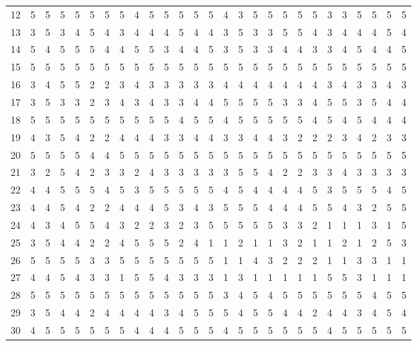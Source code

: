 \begin{table}[htbp]
{\begin{tabular}{c *{26}{c}}
12 & 5 & 5 & 5 & 5 & 5 & 5 & 5 & 4 & 5 & 5 & 5 & 5 & 5 & 4 & 3 & 5 & 5 & 5 & 5 & 5 & 3 & 3 & 5 & 5 & 5 & 5 \\
13 & 3 & 5 & 3 & 4 & 5 & 4 & 3 & 4 & 4 & 4 & 5 & 4 & 4 & 3 & 5 & 3 & 3 & 5 & 5 & 4 & 3 & 4 & 4 & 4 & 5 & 4 \\
14 & 5 & 4 & 5 & 5 & 5 & 4 & 4 & 5 & 5 & 3 & 4 & 4 & 5 & 3 & 5 & 3 & 3 & 4 & 4 & 3 & 3 & 4 & 5 & 4 & 4 & 5 \\
15 & 5 & 5 & 5 & 5 & 5 & 5 & 5 & 5 & 5 & 5 & 5 & 5 & 5 & 5 & 5 & 5 & 5 & 5 & 5 & 5 & 5 & 5 & 5 & 5 & 5 & 5 \\
16 & 3 & 4 & 5 & 5 & 2 & 2 & 3 & 4 & 3 & 3 & 3 & 3 & 3 & 4 & 4 & 4 & 4 & 4 & 4 & 4 & 3 & 4 & 3 & 3 & 4 & 3 \\
17 & 3 & 5 & 3 & 3 & 2 & 3 & 4 & 3 & 4 & 3 & 3 & 4 & 4 & 5 & 5 & 5 & 5 & 3 & 3 & 4 & 5 & 5 & 3 & 5 & 4 & 4 \\
18 & 5 & 5 & 5 & 5 & 5 & 5 & 5 & 5 & 5 & 5 & 4 & 5 & 5 & 4 & 5 & 5 & 5 & 5 & 5 & 4 & 5 & 4 & 5 & 4 & 4 & 4 \\
19 & 4 & 3 & 5 & 4 & 2 & 2 & 4 & 4 & 4 & 3 & 3 & 4 & 4 & 3 & 3 & 4 & 4 & 3 & 2 & 2 & 2 & 3 & 4 & 2 & 3 & 3 \\
20 & 5 & 5 & 5 & 5 & 4 & 4 & 5 & 5 & 5 & 5 & 5 & 5 & 5 & 5 & 5 & 5 & 5 & 5 & 5 & 5 & 5 & 5 & 5 & 5 & 5 & 5 \\
21 & 3 & 2 & 5 & 4 & 2 & 3 & 3 & 2 & 4 & 3 & 3 & 3 & 3 & 3 & 5 & 5 & 4 & 2 & 2 & 3 & 3 & 4 & 3 & 3 & 3 & 3 \\
22 & 4 & 4 & 5 & 5 & 5 & 4 & 5 & 3 & 5 & 5 & 5 & 5 & 5 & 4 & 5 & 4 & 4 & 4 & 4 & 5 & 3 & 5 & 5 & 5 & 4 & 5 \\
23 & 4 & 4 & 5 & 4 & 2 & 2 & 4 & 4 & 4 & 5 & 3 & 4 & 3 & 5 & 5 & 5 & 4 & 4 & 4 & 5 & 5 & 4 & 3 & 2 & 5 & 5 \\
24 & 4 & 3 & 4 & 5 & 5 & 4 & 3 & 2 & 2 & 3 & 2 & 3 & 5 & 5 & 5 & 5 & 5 & 3 & 3 & 2 & 1 & 1 & 1 & 3 & 1 & 5 \\
25 & 3 & 5 & 4 & 4 & 2 & 2 & 4 & 5 & 5 & 5 & 2 & 4 & 1 & 1 & 2 & 1 & 1 & 3 & 2 & 1 & 1 & 2 & 1 & 2 & 5 & 3 \\
26 & 5 & 5 & 5 & 5 & 3 & 3 & 5 & 5 & 5 & 5 & 5 & 5 & 5 & 1 & 1 & 4 & 3 & 2 & 2 & 2 & 1 & 1 & 3 & 3 & 1 & 1 \\
27 & 4 & 4 & 5 & 4 & 3 & 3 & 1 & 5 & 5 & 4 & 3 & 3 & 3 & 1 & 3 & 1 & 1 & 1 & 1 & 1 & 5 & 5 & 3 & 1 & 1 & 1 \\
28 & 5 & 5 & 5 & 5 & 5 & 5 & 5 & 5 & 5 & 5 & 5 & 5 & 5 & 3 & 4 & 5 & 4 & 5 & 5 & 5 & 5 & 5 & 5 & 4 & 5 & 5 \\
29 & 3 & 5 & 4 & 4 & 2 & 4 & 4 & 4 & 4 & 3 & 4 & 5 & 5 & 5 & 4 & 5 & 5 & 4 & 4 & 2 & 4 & 4 & 3 & 4 & 5 & 4 \\
30 & 4 & 5 & 5 & 5 & 5 & 5 & 5 & 4 & 4 & 4 & 5 & 5 & 5 & 4 & 5 & 5 & 5 & 5 & 5 & 5 & 4 & 5 & 5 & 5 & 5 & 5 \\
\bottomrule
\end{tabular}%
}
\end{table}

